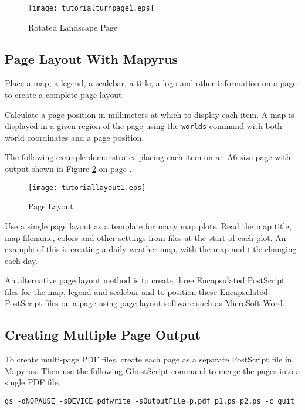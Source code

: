 

\begin{figure}[htb]
\texttt{[image: tutorialturnpage1.eps]}
\caption{Rotated Landscape Page}
\label{tutorialturnpage1}
\end{figure}

\subsection{Page Layout With Mapyrus}

Place a map, a legend, a scalebar, a title, a logo and other information on
a page to create a complete page layout.

Calculate a page position in millimeters at which to display each item.
A map is displayed in a given region of the page using
the \texttt{worlds} command with both world coordinates
and a page position.

The following example demonstrates placing each item on an A6 size
page with output shown in Figure \ref{tutoriallayout1}
on page \pageref{tutoriallayout1}.



\begin{figure}[htb]
\texttt{[image: tutoriallayout1.eps]}
\caption{Page Layout}
\label{tutoriallayout1}
\end{figure}

Use a single page layout as a template for many map plots.  Read the map title,
map filename, colors and other settings from files at the start of each plot.
An example of this is creating a daily weather map, with the map and title
changing each day.

An alternative page layout method is to create three Encapsulated PostScript
files for the map, legend and scalebar and to position these Encapsulated
PostScript files on a page using page layout software such as MicroSoft Word.

\subsection{Creating Multiple Page Output}

To create multi-page PDF files, create each page as a separate
PostScript file in Mapyrus.  Then use the following GhostScript command to
merge the pages into a single PDF file:

\begin{verbatim}
gs -dNOPAUSE -sDEVICE=pdfwrite -sOutputFile=p.pdf p1.ps p2.ps -c quit
\end{verbatim}

